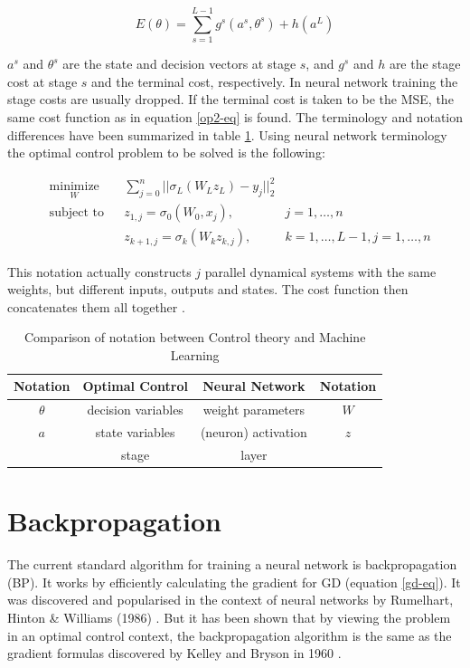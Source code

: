 \begin{equation}
E(\theta) = \sum\limits_{s=1}^{L-1}g^s(a^s,\theta^s) + h(a^L)
\end{equation}


$a^s$ and $\theta^s$ are the state and decision vectors at stage $s$, and $g^s$ and $h$ are the stage cost at stage $s$ and the terminal cost, respectively. In neural network training the stage costs are usually dropped. If the terminal cost is taken to be the MSE, the same cost function as in equation \ref{op2-eq} is found. The terminology and notation differences have been summarized in table \ref{trans-tbl}. Using neural network terminology the optimal control problem to be solved is the following:

\begin{equation}
	\begin{aligned}
	& \underset{W}{\text{minimize}}
	& & \sum\limits_{j=0}^{n}||\sigma_L(W_Lz_L) - y_j||^2_2 \\
	& \text{subject to}
	& & z_{1,j} = \sigma_0(W_0,x_j), &j = 1,\ldots,n \\
	& & & z_{k+1,j} = \sigma_k(W_kz_{k,j}), &k = 1,\ldots,L-1,j = 1,\ldots,n
	\end{aligned}
	\label{ocp-eq}
\end{equation}

This notation actually constructs $j$ parallel dynamical systems with the same weights, but different inputs, outputs and states. The cost function then concatenates them all together \cite{dreyfus1990}.

\begin{table}
\centering
\begin{tabular}{c | c | c | c}
Notation & Optimal Control & Neural Network & Notation\\ \hline
$\theta$ & decision variables & weight parameters & $W$\\
$a$ & state variables & (neuron) activation & $z$\\
& stage & layer \\
\end{tabular}
\caption{Comparison of notation between Control theory and Machine Learning}
\label{trans-tbl}
\end{table}


\section{Backpropagation}
The current standard algorithm for training a neural network is backpropagation (BP). It works by efficiently calculating the gradient for GD (equation \ref{gd-eq}). It was discovered and popularised in the context of neural networks by Rumelhart, Hinton \& Williams (1986) \cite{Rumelhart1986}. But it has been shown that by viewing the problem in an optimal control context, the backpropagation algorithm is the same as the gradient formulas discovered by Kelley and Bryson in 1960 \cite{dreyfus1990}.

